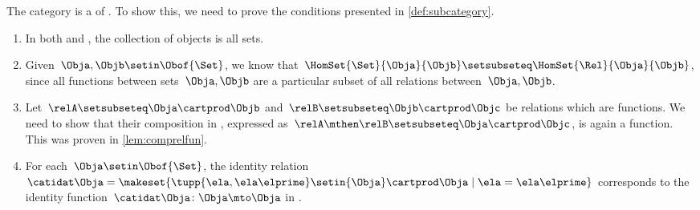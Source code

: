\begin{example}
    The category \Set is a  of \Rel.
    To show this, we need to prove the conditions presented in \cref{def:subcategory}.
    \begin{enumerate}
        \item In both \Rel and \Set, the collection of objects is all sets.
        \item Given~$\Obja,\Objb\setin \Obof{\Set}$, we know that~$\HomSet{\Set}{\Obja}{\Objb}\setsubseteq \HomSet{\Rel}{\Obja}{\Objb}$, since all functions between sets~$\Obja,\Objb$ are a particular subset of all relations between~$\Obja,\Objb$.
        \item Let~$\relA\setsubseteq \Obja\cartprod \Objb$ and~$\relB\setsubseteq \Objb \cartprod \Objc$ be relations which are functions.
              We need to show that their composition in \Rel, expressed as~$\relA\mthen \relB\setsubseteq \Obja\cartprod \Objc$, is again a function.
              This was proven in \cref{lem:comprelfun}.
        \item For each~$\Obja \setin \Obof{\Set}$, the identity relation~$\catidat\Obja=\makeset{\tupp{\ela,\ela\elprime}\setin {\Obja} \cartprod \Obja \mid \ela=\ela\elprime}$ corresponds to the identity function~$\catidat\Obja \colon \Obja \mto \Obja$ in \Set.
    \end{enumerate}
\end{example}
